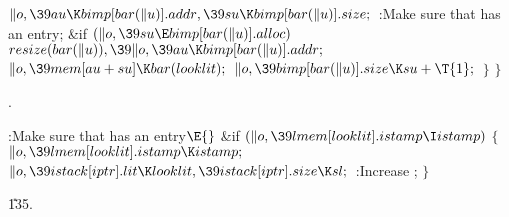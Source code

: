 ${}\|o,\39\\{au}\K\\{bimp}[\\{bar}(\|u)].\\{addr},\39\\{su}\K\\{bimp}[\\{bar}(%
\|u)].\\{size};{}$\6
:Make sure that  has an  entry\X;\6
\&{if} ${}(\|o,\39\\{su}\E\\{bimp}[\\{bar}(\|u)].\\{alloc}){}$\1\5
${}\\{resize}(\\{bar}(\|u)),\39\|o,\39\\{au}\K\\{bimp}[\\{bar}(\|u)].%
\\{addr};{}$\2\6
${}\|o,\39\\{mem}[\\{au}+\\{su}]\K\\{bar}(\\{looklit});{}$\6
${}\|o,\39\\{bimp}[\\{bar}(\|u)].\\{size}\K\\{su}+\T{1};{}$\6
\4${}\}{}$\2\6
\4${}\}{}$\2\par
{}.\fi

\B{}:Make sure that  has an  entry\X${}\E{}$\6
\&{if} ${}(\|o,\39\\{lmem}[\\{looklit}].\\{istamp}\I\\{istamp}){}$\5
${}\{{}$\1\6
${}\|o,\39\\{lmem}[\\{looklit}].\\{istamp}\K\\{istamp};{}$\6
${}\|o,\39\\{istack}[\\{iptr}].\\{lit}\K\\{looklit},\39\\{istack}[\\{iptr}].%
\\{size}\K\\{sl};{}$\6
:Increase \X;\6
\4${}\}{}$\2\par
\U135.\fi

